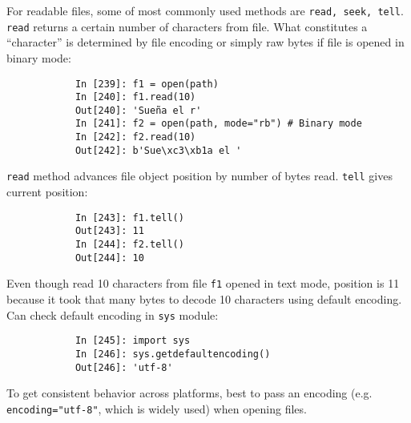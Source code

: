 \documentclass{article}
\begin{document}
\begin{itemize}
\begin{itemize}
		For readable files, some of most commonly used methods are {\tt read, seek, tell}. {\tt read} returns a certain number of characters from file. What constitutes a ``character'' is determined by file encoding or simply raw bytes if file is opened in binary mode:
		\begin{verbatim}
			In [239]: f1 = open(path)
			In [240]: f1.read(10)
			Out[240]: 'Sueña el r'
			In [241]: f2 = open(path, mode="rb") # Binary mode
			In [242]: f2.read(10)
			Out[242]: b'Sue\xc3\xb1a el '
		\end{verbatim}
		{\tt read} method advances file object position by number of bytes read. {\tt tell} gives current position:
		\begin{verbatim}
			In [243]: f1.tell()
			Out[243]: 11
			In [244]: f2.tell()
			Out[244]: 10
		\end{verbatim}
		Even though read 10 characters from file {\tt f1} opened in text mode, position is 11 because it took that many bytes to decode 10 characters using default encoding. Can check default encoding in {\tt sys} module:
		\begin{verbatim}
			In [245]: import sys
			In [246]: sys.getdefaultencoding()
			Out[246]: 'utf-8'
		\end{verbatim}
		To get consistent behavior across platforms, best to pass an encoding (e.g. {\tt encoding="utf-8"}, which is widely used) when opening files.
		

\end{itemize}
\end{itemize}
\end{document}
